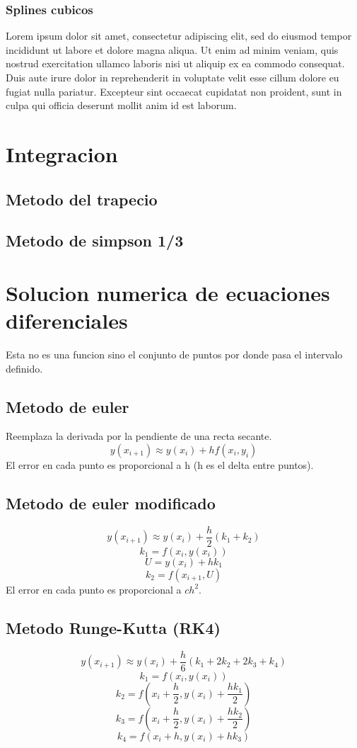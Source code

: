 \documentclass[11pt]{article}
\begin{document}
\subsubsection{Splines cubicos}
Lorem ipsum dolor sit amet, consectetur adipiscing elit, sed do eiusmod tempor incididunt ut labore et dolore magna aliqua. Ut enim ad minim veniam, quis nostrud exercitation ullamco laboris nisi ut aliquip ex ea commodo consequat. Duis aute irure dolor in reprehenderit in voluptate velit esse cillum dolore eu fugiat nulla pariatur. Excepteur sint occaecat cupidatat non proident, sunt in culpa qui officia deserunt mollit anim id est laborum.

\newpage
\section{Integracion}
\subsection{Metodo del trapecio}

\subsection{Metodo de simpson 1/3}

\newpage
\section{Solucion numerica de ecuaciones diferenciales}
Esta no es una funcion sino el conjunto de puntos por donde pasa el intervalo definido.
\subsection{Metodo de euler}
Reemplaza la derivada por la pendiente de una recta secante.
\[ y(x_{i+1}) \approx y(x_{i}) + hf(x_{i},y_{i})\]
El error en cada punto es proporcional a h (h es el delta entre puntos).
\subsection{Metodo de euler modificado}
\[ y(x_{i+1}) \approx y(x_{i}) + \dfrac{h}{2} (k_{1}+k_{2})\]
\[ k_{1} = f(x_{i},y(x_{i})) \]
\[ U = y(x_{i}) + hk_{1}\]
\[ k_{2} = f(x_{i+1}, U)\]
El error en cada punto es proporcional a $ch^{2}$.

\subsection{Metodo Runge-Kutta (RK4)}
\[ y(x_{i+1}) \approx y(x_{i}) + \dfrac{h}{6} (k_{1}+2k_{2}+2k_{3}+k_{4})\]
\[ k_{1} = f(x_{i},y(x_{i})) \]
\[ k_{2} = f(x_{i}+\dfrac{h}{2},y(x_{i}) + \dfrac{hk_{1}}{2}) \]
\[ k_{3} = f(x_{i}+\dfrac{h}{2},y(x_{i}) + \dfrac{hk_{2}}{2}) \]
\[ k_{4} = f(x_{i}+h,y(x_{i}) + hk_{3}) \]
\end{document}
